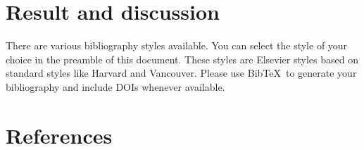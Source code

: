 \documentclass[review]{elsarticle}
\begin{document}
\section{Result and discussion}

There are various bibliography styles available. You can select the style of your choice in the preamble of this document. These styles are Elsevier styles based on standard styles like Harvard and Vancouver. Please use Bib\TeX\ to generate your bibliography and include DOIs whenever available.


\section*{References}


\end{document}
